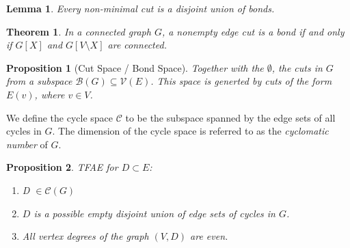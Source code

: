 \documentclass[10pt, letterpaper]{article}
\newtheorem{thm}{Theorem}
\newtheorem{lemma}{Lemma}
\newtheorem{prop}{Proposition}
\theoremstyle{remark}
\theoremstyle{definition}
\begin{document}
\newpage

\begin{lemma}
	Every non-minimal cut is a disjoint union of bonds.
\end{lemma}

\begin{thm}
	In a connected graph $G$, a nonempty edge cut is a bond if and only if $G[X]$ and $G[V \setminus X]$ are connected.
\end{thm}

\begin{prop}[Cut Space / Bond Space]
	Together with the $\emptyset$, the cuts in $G$ from a subspace $\mathcal{B}(G) \subseteq \mathcal{V}(E)$. This space is generted by cuts of the form $E(v)$, where $v \in V$.
\end{prop}

We define the cycle space $\mathcal{C}$ to be the subspace spanned by the edge sets of all cycles in $G$. The dimension of the cycle space is referred to as the \textit{cyclomatic number} of $G$.

\begin{prop}
TFAE for $D \subset E$:

\begin{enumerate}
	\item[(a)] D $\in \mathcal{C}(G)$
	\item[(b)] $D$ is a  possible empty disjoint union of edge sets of cycles in $G$.
	\item[(c)] All vertex degrees of the graph $(V, D)$ are even.
\end{enumerate}
\end{prop}
\end{document}
